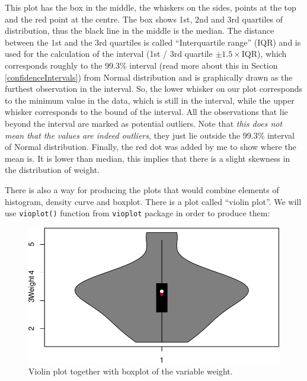 \documentclass[
]{book}
\newenvironment{Shaded}{\begin{snugshade}}{\end{snugshade}}
\newcommand{\AttributeTok}[1]{\textcolor[rgb]{0.13,0.29,0.53}{#1}}
\newcommand{\DecValTok}[1]{\textcolor[rgb]{0.00,0.00,0.81}{#1}}
\newcommand{\FunctionTok}[1]{\textcolor[rgb]{0.13,0.29,0.53}{\textbf{#1}}}
\newcommand{\NormalTok}[1]{#1}
\newcommand{\SpecialCharTok}[1]{\textcolor[rgb]{0.81,0.36,0.00}{\textbf{#1}}}
\newcommand{\StringTok}[1]{\textcolor[rgb]{0.31,0.60,0.02}{#1}}
\theoremstyle{definition}
\theoremstyle{definition}
\theoremstyle{definition}
\theoremstyle{definition}
\theoremstyle{remark}
\begin{document}
This plot has the box in the middle, the whiskers on the sides, points at the top and the red point at the centre. The box shows 1st, 2nd and 3rd quartiles of distribution, thus the black line in the middle is the median. The distance between the 1st and the 3rd quartiles is called ``Interquartile range'' (IQR) and is used for the calculation of the interval (1st / 3rd quartile \(\pm 1.5 \times\)IQR), which corresponds roughly to the 99.3\% interval (read more about this in Section \ref{confidenceIntervals}) from Normal distribution and is graphically drawn as the furthest observation in the interval. So, the lower whisker on our plot corresponds to the minimum value in the data, which is still in the interval, while the upper whisker corresponds to the bound of the interval. All the observations that lie beyond the interval are marked as potential outliers. Note that \emph{this does not mean that the values are indeed outliers}, they just lie outside the 99.3\% interval of Normal distribution. Finally, the red dot was added by me to show where the mean is. It is lower than median, this implies that there is a slight skewness in the distribution of weight.

There is also a way for producing the plots that would combine elements of histogram, density curve and boxplot. There is a plot called ``violin plot''. We will use \texttt{vioplot()} function from \texttt{vioplot} package in order to produce them:

\begin{Shaded}
\end{Shaded}

\begin{figure}
\centering
\includegraphics{Svetunkov---Statistics-for-Business-Analytics_files/figure-latex/vioWeight-1.pdf}
\caption{\label{fig:vioWeight}Violin plot together with boxplot of the variable weight.}
\end{figure}
\end{document}
